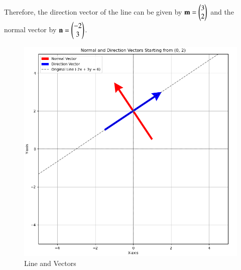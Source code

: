 \documentclass[journal]{IEEEtran}
\begin{document}
Therefore, the direction vector of the line can be given by $\mathbf{m} = \begin{pmatrix}3 \\ 2\end{pmatrix}$ and the normal vector by $\mathbf{n} = \begin{pmatrix}-2 \\ 3\end{pmatrix}$.

\begin{figure}[H]
    \centering
    \includegraphics[width=0.7\columnwidth]{figs/Figure_1.png}
    \caption{Line and Vectors}
    \label{4-4.2-3-fig-0}
\end{figure}
\end{document}
